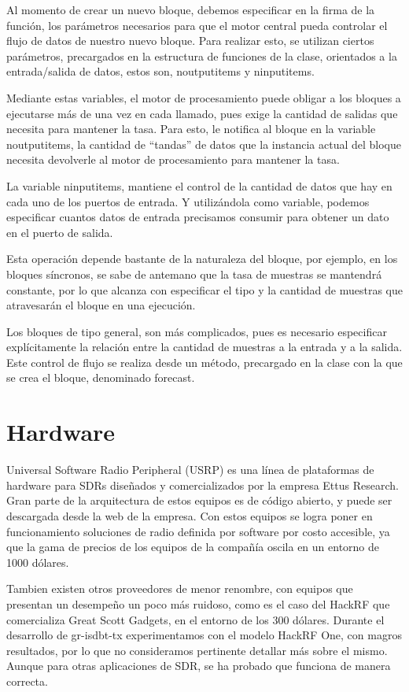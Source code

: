 Al momento de crear un nuevo bloque, debemos especificar en la firma de la función, los parámetros necesarios para que el motor central pueda controlar el flujo de datos de nuestro nuevo bloque. Para realizar esto, se utilizan ciertos parámetros, precargados en la estructura de funciones de la clase, orientados a la entrada/salida de datos, estos son,  noutputitems y ninputitems. 

Mediante estas variables, el motor de procesamiento puede obligar a los bloques a ejecutarse más de una vez en cada llamado, pues exige la cantidad de salidas que necesita para mantener la tasa. Para esto, le notifica al bloque en la variable noutputitems, la cantidad de “tandas” de datos que la instancia actual del bloque necesita devolverle al motor de procesamiento para mantener la tasa. 

La variable ninputitems, mantiene el control de la cantidad de datos que hay en cada uno de los puertos de entrada. Y utilizándola como variable, podemos especificar cuantos datos de entrada precisamos consumir para obtener un dato en el puerto de salida.

Esta operación depende bastante de la naturaleza del bloque, por ejemplo, en los bloques síncronos, se sabe de antemano que la tasa de muestras se mantendrá constante, por lo que alcanza con especificar el tipo y la cantidad de muestras que atravesarán el bloque en una ejecución. 

Los bloques de tipo general, son más complicados, pues es necesario especificar explícitamente la relación entre la cantidad de muestras a la entrada y a la salida. Este control de flujo se realiza desde un método, precargado en la clase con la que se crea el bloque, denominado forecast.

\section{Hardware}
Universal Software Radio Peripheral (\gls{USRP}) es una línea de plataformas de hardware para SDRs diseñados y comercializados por la empresa Ettus Research. Gran parte de la arquitectura de estos equipos es de código abierto, y puede ser descargada desde la web de la empresa. Con estos equipos se logra poner en funcionamiento soluciones de radio definida por software por costo accesible, ya que la gama de precios de los equipos de la compañía oscila en un entorno de 1000 dólares. 

Tambien existen otros proveedores de menor renombre, con equipos que presentan un desempeño un poco más ruidoso, como es el caso del HackRF que comercializa Great Scott Gadgets\cite{GreatScottGadgets}, en el entorno de los 300 dólares. Durante el desarrollo de gr-isdbt-tx experimentamos con el modelo HackRF One, con magros resultados, por lo que no consideramos pertinente detallar más sobre el mismo. Aunque para otras aplicaciones de SDR, se ha probado que funciona de manera correcta.

